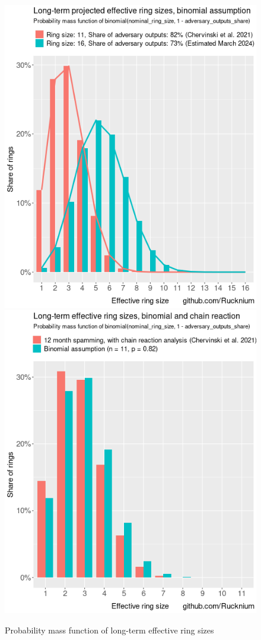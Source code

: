 \documentclass[usletter,11pt,english,openany]{article}
\begin{document}
\begin{figure}[H]
\caption{Probability mass function of long-term effective ring sizes}
\label{fig-effective-ring-size-binomial-pmf}
\centering{}\includegraphics[scale=0.5]{images/effective-ring-size-binomial-pmf}\includegraphics[scale=0.5]{images/chervinski-chain-reaction}
\end{figure}
\end{document}
